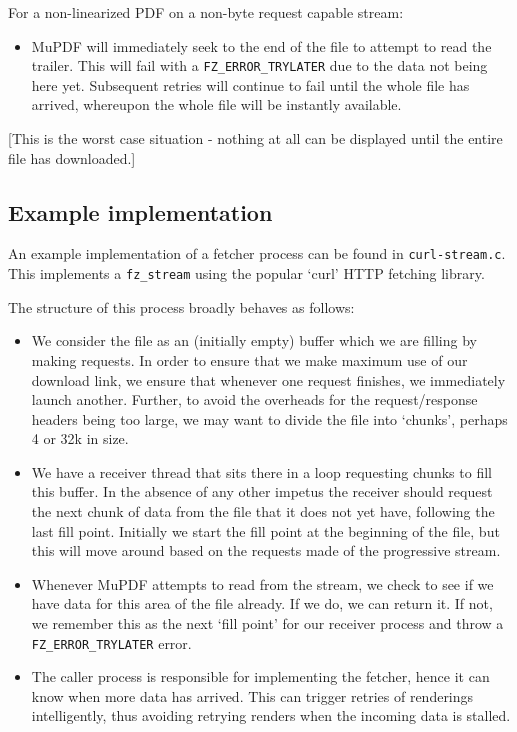 \documentclass[oneside]{book}
\begin{document}
\begin{itemize}
   For a non-linearized PDF on a non-byte request capable stream:

\begin{itemize}

\item
MuPDF will immediately seek to the end of the file to attempt to read the trailer. This will fail with a \texttt{FZ\_ERROR\_TRYLATER} due to the data not being here yet. Subsequent retries will continue to fail until the whole file has arrived, whereupon the whole file will be instantly available.
\end{itemize}

[This is the worst case situation - nothing at all can be displayed until the entire file has downloaded.]
\end{itemize}

\subsection{Example implementation}

An example implementation of a fetcher process can be found in \texttt{curl-stream.c}. This implements a \texttt{fz\_stream} using the popular `curl' HTTP fetching library.

The structure of this process broadly behaves as follows:

\begin{itemize}

\item
We consider the file as an (initially empty) buffer which we are filling by making requests. In order to ensure that we make maximum use of our download link, we ensure that whenever one request finishes, we immediately launch another. Further, to avoid the overheads for the request/response headers being too large, we may want to divide the file into `chunks', perhaps 4 or 32k in size.

\item
We have a receiver thread that sits there in a loop requesting chunks to fill this buffer. In the absence of any other impetus the receiver should request the next chunk of data from the file that it does not yet have, following the last fill point. Initially we start the fill point at the beginning of the file, but this will move around based on the requests made of the progressive stream.

\item
Whenever MuPDF attempts to read from the stream, we check to see if we have data for this area of the file already. If we do, we can return it. If not, we remember this as the next `fill point' for our receiver process and throw a \texttt{FZ\_ERROR\_TRYLATER} error.

\item
The caller process is responsible for implementing the fetcher, hence it can know when more data has arrived. This can trigger retries of renderings intelligently, thus avoiding retrying renders when the incoming data is stalled.

\end{itemize}
\end{document}
